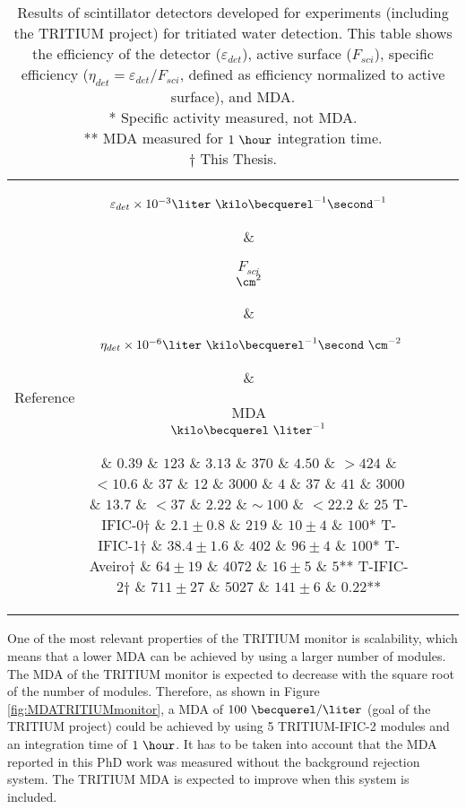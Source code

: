 \begin{enumerate}
\begin{table}[htbp]
\centering{}%
\begin{tabular}{lcrcc}
\toprule 
Reference & \parbox{5em}{$\varepsilon_{det}\times10^{-3}\\\liter~\kilo\becquerel^{-1}\second^{-1}$}  & \parbox{3.5em}{\raggedleft $F_{sci}$\\ $\cm^2$}  & \parbox{6.5em}{$~\eta_{det}\times 10^{-6}\\\liter~\kilo\becquerel^{-1}\second~\cm^{-2}$} &  \parbox{3.5em}{MDA\\$\kilo\becquerel~\liter^{-1}$} \tabularnewline
\midrule
\midrule 
\cite{Muramatsu} & $0.39$ & $123$ & $3.13$ & $370$ \tabularnewline
\cite{Moghissi} & $4.50$ & $>424$ & $<10.6$ & $37$ \tabularnewline
\cite{Osborne} & $12$ & $3000$ & $4$ & $37$ \tabularnewline
\cite{Ratnakaran} & $41$ & $3000$ & $13.7$ & $<37$ \tabularnewline
\cite{Hofstetter1} & $2.22$ & $\sim~100$ & $<22.2$ & $25$ \tabularnewline
T-IFIC-0$\dagger$ & $2.1 \pm 0.8$ & $219$ & $10 \pm 4$ & $100$* \tabularnewline
T-IFIC-1$\dagger$ & $38.4 \pm 1.6$ & $402$ & $96 \pm 4$ & $100$* \tabularnewline
T-Aveiro$\dagger$ & $64 \pm 19$ & $4072$ & $16 \pm 5$ & $5$** \tabularnewline
T-IFIC-2$\dagger$ & $711 \pm 27$ & $5027$ & $141 \pm 6$ & $0.22$** \tabularnewline
\bottomrule
\end{tabular}
\caption{Results of scintillator detectors developed for experiments (including the TRITIUM project) for tritiated water detection. This table shows the efficiency of the detector ($\varepsilon_{det}$), active surface ($F_{sci}$), specific efficiency ($\eta_{det}=\varepsilon_{det}/F_{sci}$, defined as efficiency normalized to active surface), and MDA.\\
* Specific activity measured, not MDA.\\ 
** MDA measured for $1~\hour$ integration time.\\
$\dagger$ This Thesis.}
\label{tab:ComparisonResultsTritium}
\end{table}

One of the most relevant properties of the TRITIUM monitor is scalability, which means that a lower MDA can be achieved by using a larger number of modules. The MDA of the TRITIUM monitor is expected to decrease with the square root of the number of modules. Therefore, as shown in Figure \ref{fig:MDATRITIUMmonitor}, a MDA of  $100~\becquerel/\liter$ (goal of the TRITIUM project) could be achieved by using 5 TRITIUM-IFIC-2 modules and an integration time of $1~\hour$. It has to be taken into account that the MDA reported in this PhD work was measured without the background rejection system. The TRITIUM MDA is expected to improve when this system is included.


\end{enumerate}
